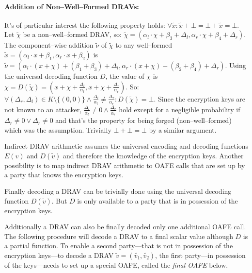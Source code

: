 \paragraph{Addition of Non--Well--Formed DRAVs:} It's of particular interest the
following property holds: $\forall \widetilde{x}: \widetilde{x} + \bot = \bot
+ \widetilde{x} = \bot$. Let $\widetilde{\chi}$ be a non--well--formed DRAV,
so: $\widetilde{\chi} = (\alpha_l \cdot \chi + \beta_3 + \Delta_l, \alpha_r
\cdot \chi + \beta_4 + \Delta_r)$. The component--wise addition
$\widetilde{\nu}$ of $\widetilde{\chi}$ to any well--formed $\widetilde{x} =
(\alpha_l \cdot x + \beta_1, \alpha_r \cdot x + \beta_2)$ is $\widetilde{\nu} =
(\alpha_l \cdot (x+\chi) + (\beta_1+\beta_3) + \Delta_l, \alpha_r \cdot (x+\chi)
+ (\beta_2+\beta_4) + \Delta_r)$. Using the universal decoding function $D$, the
value of $\chi$ is $\chi = D(\widetilde{\chi}) = (x + \chi +
\frac{\Delta_l}{\alpha_l}, x + \chi + \frac{\Delta_r}{\alpha_r})$. So: $\forall
(\Delta_r, \Delta_l) \in K \setminus \{(0, 0)\} \wedge \frac{\Delta_l}{\alpha_l}
\neq \frac{\Delta_r}{\alpha_r}: D(\widetilde{\chi}) = \bot$. Since the
encryption keys are not known to an attacker, $\frac{\Delta_l}{\alpha_l} \neq 0
\wedge \frac{\Delta_r}{\alpha_r}$ hold except for a negligible probability if
$\Delta_r \neq 0 \vee \Delta_r \neq 0$ and that's the property for being forged
(non--well--formed) which was the assumption. Trivially $\bot + \bot = \bot$ by
a similar argument.


\label{sec:drac-arithmetic}

Indirect DRAV arithmetic assumes the universal encoding and decoding functions
$E(v)$ and $D(\widetilde{v})$ and therefore the knowledge of the encryption
keys. Another possibility is to map indirect DRAV arithmetic to OAFE calls that
are set up by a party that knows the encryption keys.


\label{sec:drav-final-decoding}

Finally decoding a DRAV can be trivially done using the universal decoding
function $D(\widetilde{v})$. But $D$ is only available to a party that is in
possession of the encryption keys.

Additionally a DRAV can also be finally decoded only one additional OAFE call.
The following procedure will decode a DRAV to a final scalar value although
$D$ is a partial function. To enable a second party---that is not in possession
of the encryption keys---to decode a DRAV $\widetilde{v} = (\widetilde{v_1},
\widetilde{v_2})$, the first party---in possession of the keys---needs to set up
a special OAFE, called the \emph{final OAFE} below.

